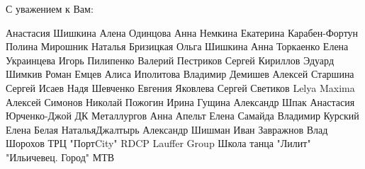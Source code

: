 С уважением к Вам:

\obeycr
Анастасия Шишкина
Алена Одинцова
Анна Немкина
Екатерина Карабен-Фортун
Полина Мирошник
Наталья Бризицкая
Ольга Шишкина
Анна Торкаенко
Елена Украинцева
Игорь Пилипенко
Валерий Пестриков
Сергей Кириллов
Эдуард Шимкив
Роман Емцев
Алиса Иполитова
Владимир Демишев
Алексей Старшина
Сергей Исаев
Надя Шевченко
Евгения Яковлева
Сергей Светиков
Lelya Maxima
Алексей Симонов
Николай Пожогин
Ирина Гущина
Александр Шпак
Анастасия Юрченко-Джой
ДК Металлургов
Анна Апельт
Елена Самайда
Владимир Курский
Елена Белая
НатальяДжалтырь
Александр Шишман
Иван Завражнов
Влад Шорохов
ТРЦ "ПортCity"
RDCP 
Lauffer Group
Школа танца "Лилит"
"Ильичевец. Город"
МТВ
\restorecr

